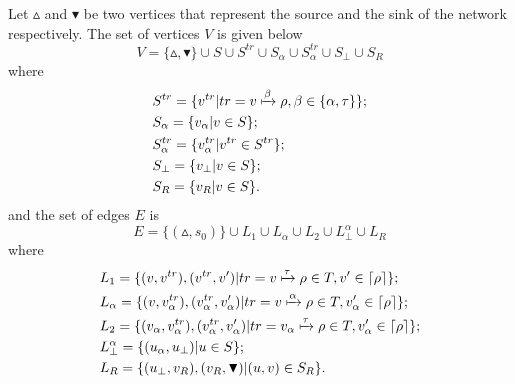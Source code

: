 \documentclass[a4paper,runningheads]{llncs}
\begin{document}
Let $\vartriangle$ and $\blacktriangledown$ be two vertices that represent the source and the sink of the network respectively. The set of vertices $V$ is given below
\[V=\{\vartriangle,\blacktriangledown\}\cup S\cup S^{tr}\cup S_{\alpha}\cup S_{\alpha}^{tr}\cup S_{\bot}\cup S_{R}\] where
\begin{equation*}
    \begin{aligned}
    & S^{tr}=\{v^{tr}|tr=v \xmapsto{\beta} \rho ,\beta\in\{\alpha,\tau\}\};\\
    & S_{\alpha}=\{v_{\alpha}|v\in S\};\\
    & S_{\alpha}^{tr}=\{v_{\alpha}^{tr}|v^{tr}\in S^{tr}\};\\
    & S_{\bot}=\{v_{\bot}|v\in S\};\\
    & S_{R}=\{v_{R}|v\in S\}.
    \end{aligned}
\end{equation*}
and the set of edges $E$ is
\[E=\{(\vartriangle,s_{0})\}\cup L_{1}\cup L_{\alpha}\cup L_{2}\cup L_{\bot}^{\alpha}\cup L_{R}\] where
\begin{equation*}
    \begin{aligned}
    & L_{1}=\{(v,v^{tr}),(v^{tr},v')|tr=v\xmapsto{\tau}\rho\in T,v'\in\lceil\rho\rceil\};\\
    & L_{\alpha}=\{(v,v_{\alpha}^{tr}),(v_{\alpha}^{tr},v'_{\alpha})|tr=v\xmapsto{\alpha}\rho\in T,v'_{\alpha}\in\lceil\rho\rceil\};\\
    & L_{2}=\{(v_{\alpha},v_{\alpha}^{tr}),(v_{\alpha}^{tr},v'_{\alpha})|tr=v_{\alpha}\xmapsto{\tau}\rho\in T,v'_{\alpha}\in\lceil\rho\rceil\};\\
    & L_{\bot}^{\alpha}=\{(u_{
    \alpha},u_{\bot})|u\in S\};\\
    & L_{R}=\{(u_{\bot},v_{R}),(v_{R},\blacktriangledown)|(u,v)\in S_{R}\}.
    \end{aligned}
\end{equation*}
\end{document}
